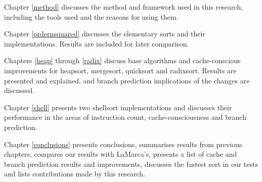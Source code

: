 Chapter \ref{method} discusses the method and framework used in this research,
including the tools used and the reasons for using them.

Chapter \ref{ordernsquared}  discusses the elementary sorts and their
implementations. Results are included for later comparison.

Chapters \ref{heap} through \ref{radix} discuss base algorithms and
cache-conscious improvements for heapsort, mergesort, quicksort and radixsort.
Results are presented and explained, and branch prediction implications of the
changes are discussed.

Chapter \ref{shell} presents two shellsort implementations and discusses their
performance in the areas of instruction count, cache-consciousness and branch
prediction.

Chapter \ref{conclusions} presents conclusions, summarises results from previous
chapters, compares our results with LaMarca's, presents a list of cache and
branch prediction results and improvements, discusses the fastest sort in our
tests and lists contributions made by this research.
